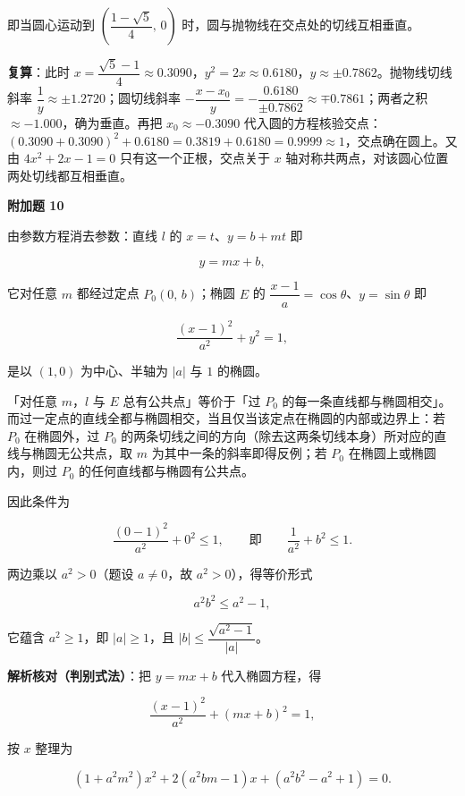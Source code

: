 \begin{answer}
即当圆心运动到 $\left(\dfrac{1-\sqrt5}{4},\,0\right)$ 时，圆与抛物线在交点处的切线互相垂直。

\textbf{复算}：此时 $x=\dfrac{\sqrt5-1}{4}\approx0.3090$，$y^2=2x\approx0.6180$，$y\approx\pm0.7862$。抛物线切线斜率 $\dfrac1y\approx\pm1.2720$；圆切线斜率 $-\dfrac{x-x_0}{y}=-\dfrac{0.6180}{\pm0.7862}\approx\mp0.7861$；两者之积 $\approx-1.000$，确为垂直。再把 $x_0\approx-0.3090$ 代入圆的方程核验交点：$(0.3090+0.3090)^2+0.6180=0.3819+0.6180=0.9999\approx1$，交点确在圆上。又由 $4x^2+2x-1=0$ 只有这一个正根，交点关于 $x$ 轴对称共两点，对该圆心位置两处切线都互相垂直。

\textbf{附加题 10}

由参数方程消去参数：直线 $l$ 的 $x=t$、$y=b+mt$ 即

\nopagebreak[4]
\[
y=mx+b,
\]

它对任意 $m$ 都经过定点 $P_0(0,\,b)$；椭圆 $E$ 的 $\dfrac{x-1}{a}=\cos\theta$、$y=\sin\theta$ 即

\nopagebreak[4]
\[
\frac{(x-1)^2}{a^2}+y^2=1,
\]

是以 $(1,0)$ 为中心、半轴为 $|a|$ 与 $1$ 的椭圆。

「对任意 $m$，$l$ 与 $E$ 总有公共点」等价于「过 $P_0$ 的每一条直线都与椭圆相交」。而过一定点的直线全都与椭圆相交，当且仅当该定点在椭圆的内部或边界上：若 $P_0$ 在椭圆外，过 $P_0$ 的两条切线之间的方向（除去这两条切线本身）所对应的直线与椭圆无公共点，取 $m$ 为其中一条的斜率即得反例；若 $P_0$ 在椭圆上或椭圆内，则过 $P_0$ 的任何直线都与椭圆有公共点。

因此条件为

\nopagebreak[4]
\[
\frac{(0-1)^2}{a^2}+0^2\leqslant1,
\qquad\text{即}\qquad
\frac1{a^2}+b^2\leqslant1.
\]

两边乘以 $a^2>0$（题设 $a\neq0$，故 $a^2>0$），得等价形式

\nopagebreak[4]
\[
a^2b^2\leqslant a^2-1,
\]

它蕴含 $a^2\geqslant1$，即 $|a|\geqslant1$，且 $|b|\leqslant\dfrac{\sqrt{a^2-1}}{|a|}$。

\textbf{解析核对（判别式法）}：把 $y=mx+b$ 代入椭圆方程，得

\nopagebreak[4]
\[
\frac{(x-1)^2}{a^2}+(mx+b)^2=1,
\]

按 $x$ 整理为

\nopagebreak[4]
\[
\left(1+a^2m^2\right)x^2+2\left(a^2bm-1\right)x+\left(a^2b^2-a^2+1\right)=0 .
\]


\end{answer}
